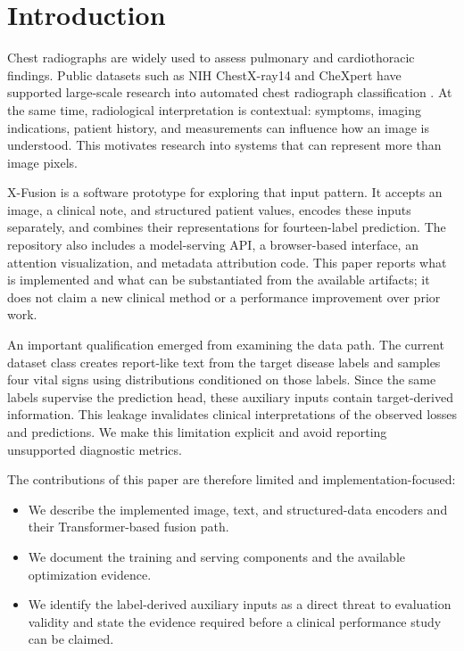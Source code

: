 \documentclass[conference]{IEEEtran}
\begin{document}
\section{Introduction}
Chest radiographs are widely used to assess pulmonary and cardiothoracic findings. Public datasets such as NIH ChestX-ray14 and CheXpert have supported large-scale research into automated chest radiograph classification \cite{wang2017,irvin2019}. At the same time, radiological interpretation is contextual: symptoms, imaging indications, patient history, and measurements can influence how an image is understood. This motivates research into systems that can represent more than image pixels.

X-Fusion is a software prototype for exploring that input pattern. It accepts an image, a clinical note, and structured patient values, encodes these inputs separately, and combines their representations for fourteen-label prediction. The repository also includes a model-serving API, a browser-based interface, an attention visualization, and metadata attribution code. This paper reports what is implemented and what can be substantiated from the available artifacts; it does not claim a new clinical method or a performance improvement over prior work.

An important qualification emerged from examining the data path. The current dataset class creates report-like text from the target disease labels and samples four vital signs using distributions conditioned on those labels. Since the same labels supervise the prediction head, these auxiliary inputs contain target-derived information. This leakage invalidates clinical interpretations of the observed losses and predictions. We make this limitation explicit and avoid reporting unsupported diagnostic metrics.

The contributions of this paper are therefore limited and implementation-focused:
\begin{itemize}
  \item We describe the implemented image, text, and structured-data encoders and their Transformer-based fusion path.
  \item We document the training and serving components and the available optimization evidence.
  \item We identify the label-derived auxiliary inputs as a direct threat to evaluation validity and state the evidence required before a clinical performance study can be claimed.
\end{itemize}
\end{document}
